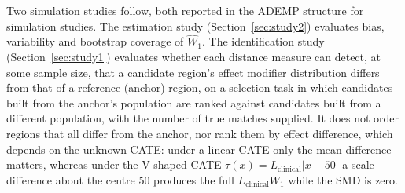 \documentclass[AMA,Times1COL]{WileyNJDv5}
\begin{document}
Two simulation studies follow, both reported in the ADEMP structure for simulation studies.\cite{morris2019} The estimation study (Section~\ref{sec:study2}) evaluates bias, variability and bootstrap coverage of $\widehat{W}_1$. The identification study (Section~\ref{sec:study1}) evaluates whether each distance measure can detect, at some sample size, that a candidate region's effect modifier distribution differs from that of a reference (anchor) region, on a selection task in which candidates built from the anchor's population are ranked against candidates built from a different population, with the number of true matches supplied. It does not order regions that all differ from the anchor, nor rank them by effect difference, which depends on the unknown CATE: under a linear CATE only the mean difference matters, whereas under the V-shaped CATE $\tau(x) = L_{\text{clinical}} |x - 50|$ a scale difference about the centre 50 produces the full $L_{\text{clinical}} W_1$ while the SMD is zero.
\end{document}
